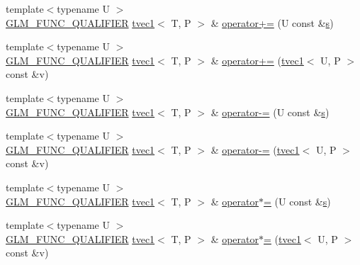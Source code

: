 \begin{DoxyCompactItemize}
\item 
{\footnotesize template$<$typename U $>$ }\\\hyperlink{setup_8hpp_a33fdea6f91c5f834105f7415e2a64407}{G\+L\+M\+\_\+\+F\+U\+N\+C\+\_\+\+Q\+U\+A\+L\+I\+F\+I\+ER} \hyperlink{structglm_1_1detail_1_1tvec1}{tvec1}$<$ T, P $>$ \& \hyperlink{structglm_1_1detail_1_1tvec1_ac367841556827c8b6a27e242490a7eef}{operator+=} (U const \&\hyperlink{structglm_1_1detail_1_1tvec1_a1025b03a3e1f99c7a42518af40737d7b}{s})
\item 
{\footnotesize template$<$typename U $>$ }\\\hyperlink{setup_8hpp_a33fdea6f91c5f834105f7415e2a64407}{G\+L\+M\+\_\+\+F\+U\+N\+C\+\_\+\+Q\+U\+A\+L\+I\+F\+I\+ER} \hyperlink{structglm_1_1detail_1_1tvec1}{tvec1}$<$ T, P $>$ \& \hyperlink{structglm_1_1detail_1_1tvec1_a7513234bbb5711f30b59e0c94d8b0c46}{operator+=} (\hyperlink{structglm_1_1detail_1_1tvec1}{tvec1}$<$ U, P $>$ const \&v)
\item 
{\footnotesize template$<$typename U $>$ }\\\hyperlink{setup_8hpp_a33fdea6f91c5f834105f7415e2a64407}{G\+L\+M\+\_\+\+F\+U\+N\+C\+\_\+\+Q\+U\+A\+L\+I\+F\+I\+ER} \hyperlink{structglm_1_1detail_1_1tvec1}{tvec1}$<$ T, P $>$ \& \hyperlink{structglm_1_1detail_1_1tvec1_a67d5463cd82056cfaaedab976195e362}{operator-\/=} (U const \&\hyperlink{structglm_1_1detail_1_1tvec1_a1025b03a3e1f99c7a42518af40737d7b}{s})
\item 
{\footnotesize template$<$typename U $>$ }\\\hyperlink{setup_8hpp_a33fdea6f91c5f834105f7415e2a64407}{G\+L\+M\+\_\+\+F\+U\+N\+C\+\_\+\+Q\+U\+A\+L\+I\+F\+I\+ER} \hyperlink{structglm_1_1detail_1_1tvec1}{tvec1}$<$ T, P $>$ \& \hyperlink{structglm_1_1detail_1_1tvec1_af596a5a7f5b2ea079cd85d576b62e326}{operator-\/=} (\hyperlink{structglm_1_1detail_1_1tvec1}{tvec1}$<$ U, P $>$ const \&v)
\item 
{\footnotesize template$<$typename U $>$ }\\\hyperlink{setup_8hpp_a33fdea6f91c5f834105f7415e2a64407}{G\+L\+M\+\_\+\+F\+U\+N\+C\+\_\+\+Q\+U\+A\+L\+I\+F\+I\+ER} \hyperlink{structglm_1_1detail_1_1tvec1}{tvec1}$<$ T, P $>$ \& \hyperlink{structglm_1_1detail_1_1tvec1_a38c64ab613b91222e34ffd8f8a97af7a}{operator$\ast$=} (U const \&\hyperlink{structglm_1_1detail_1_1tvec1_a1025b03a3e1f99c7a42518af40737d7b}{s})
\item 
{\footnotesize template$<$typename U $>$ }\\\hyperlink{setup_8hpp_a33fdea6f91c5f834105f7415e2a64407}{G\+L\+M\+\_\+\+F\+U\+N\+C\+\_\+\+Q\+U\+A\+L\+I\+F\+I\+ER} \hyperlink{structglm_1_1detail_1_1tvec1}{tvec1}$<$ T, P $>$ \& \hyperlink{structglm_1_1detail_1_1tvec1_ab5aa275a687a56ff82469c9c9334f145}{operator$\ast$=} (\hyperlink{structglm_1_1detail_1_1tvec1}{tvec1}$<$ U, P $>$ const \&v)

\end{DoxyCompactItemize}
